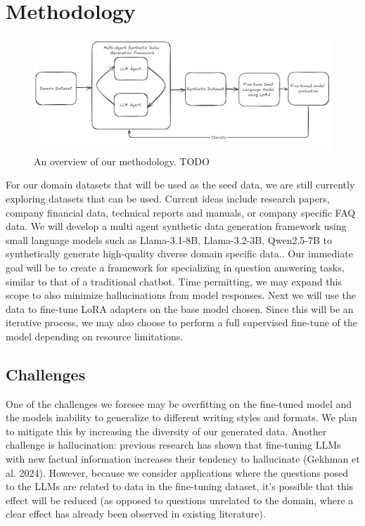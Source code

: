 \section{Methodology}

\begin{figure}[h]
  \centering
  \includegraphics[width=1\textwidth]{methodology.jpg}
  \caption{An overview of our methodology. TODO}
\end{figure}

For our domain datasets that will be used as the seed data, we are still currently exploring datasets that can be used. Current ideas include research papers, company financial data, technical reports and manuals, or company specific FAQ data.
We will develop a multi agent synthetic data generation framework using small language models such as Llama-3.1-8B, Llama-3.2-3B, Qwen2.5-7B to synthetically generate high-quality diverse domain specific data.. Our immediate goal will be to create a framework for specializing in question answering tasks, similar to that of a traditional chatbot. Time permitting, we may expand this scope to also minimize hallucinations from model responses.
Next we will use the data to fine-tune LoRA adapters on the base model chosen. Since this will be an iterative process, we may also choose to perform a full supervised fine-tune of the model depending on resource limitations.

\subsection{Challenges}

One of the challenges we foresee may be overfitting on the fine-tuned model and the models inability to generalize to different writing styles and formats. We plan to mitigate this by increasing the diversity of our generated data. Another challenge is hallucination: previous research has shown that fine-tuning LLMs with new factual information increases their tendency to hallucinate (Gekhman et al. 2024). However, because we consider applications where the questions posed to the LLMs are related to data in the fine-tuning dataset, it's possible that this effect will be reduced (as opposed to questions unrelated to the domain, where a clear effect has already been observed in existing literature).
